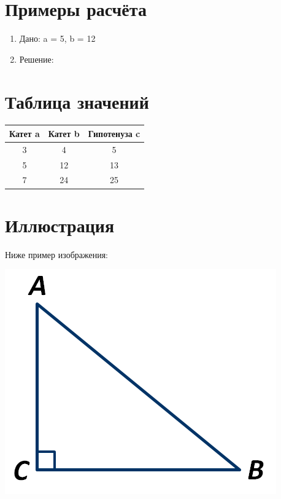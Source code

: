 \documentclass{article}
\begin{document}
\section{Примеры расчёта}
\begin{center}
\end{center}
\begin{center}
\end{center}
\begin{enumerate}
\item Дано: a = 5, b = 12
\item Решение:
\end{enumerate}
\begin{center}
\end{center}

\section{Таблица значений}
\begin{center}
\begin{tabular}{|c|c|c|}
\hline
Катет a & Катет b & Гипотенуза c \\
\hline
3 & 4 & 5 \\
\hline
5 & 12 & 13 \\
\hline
7 & 24 & 25 \\
\hline
\end{tabular}
\end{center}

\section{Иллюстрация}
\newline Ниже пример изображения:
\begin{center}
\includegraphics[width=0.5\linewidth]{triangle.png}
\end{center}
\end{document}
